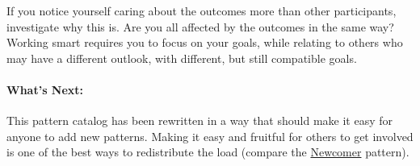 If you notice yourself caring about the outcomes more than other
participants, investigate why this is. Are you all affected by the
outcomes in the same way? Working smart requires you to focus on your
goals, while relating to others who may have a different outlook, with
different, but still compatible goals.

\paragraph{What's Next:} This pattern catalog has been rewritten in a way
that should make it easy for anyone to add new patterns. Making it easy
and fruitful for others to get involved is one of the best ways to
redistribute the load (compare
the \href{http://peeragogy.org/practice/heuristics/newcomer/}{Newcomer}
pattern).
